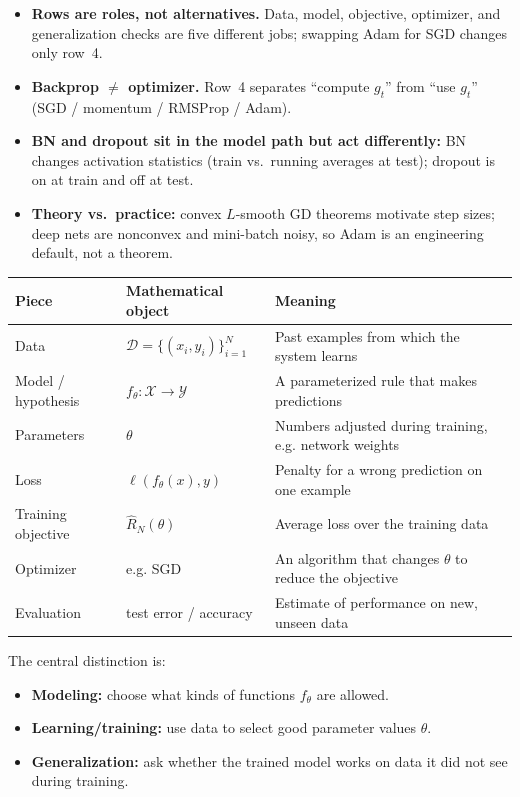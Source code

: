 \documentclass[11pt,a4paper]{article}
\theoremstyle{definition}
\begin{document}
\begin{remark}
\begin{itemize}
  \item \textbf{Rows are roles, not alternatives.} Data, model, objective, optimizer, and generalization checks are five different jobs; swapping Adam for SGD changes only row~4.
  \item \textbf{Backprop $\neq$ optimizer.} Row~4 separates ``compute $g_t$'' from ``use $g_t$'' (SGD / momentum / RMSProp / Adam).
  \item \textbf{BN and dropout sit in the model path but act differently:} BN changes activation statistics (train vs.\ running averages at test); dropout is on at train and off at test.
  \item \textbf{Theory vs.\ practice:} convex $L$-smooth GD theorems motivate step sizes; deep nets are nonconvex and mini-batch noisy, so Adam is an engineering default, not a theorem.
\end{itemize}
\end{remark}

\begin{center}
\begin{tabular}{|l|l|l|}
  \hline
  \textbf{Piece} & \textbf{Mathematical object} & \textbf{Meaning} \\ \hline
  Data & $\mathcal{D} = \{(x_i, y_i)\}_{i=1}^N$ & Past examples from which the system learns \\ \hline
  Model / hypothesis & $f_\theta : \mathcal{X} \to \mathcal{Y}$ & A parameterized rule that makes predictions \\ \hline
  Parameters & $\theta$ & Numbers adjusted during training, e.g. network weights \\ \hline
  Loss & $\ell(f_\theta(x), y)$ & Penalty for a wrong prediction on one example \\ \hline
  Training objective & $\widehat{R}_N(\theta)$ & Average loss over the training data \\ \hline
  Optimizer & e.g. SGD & An algorithm that changes $\theta$ to reduce the objective \\ \hline
  Evaluation & test error / accuracy & Estimate of performance on new, unseen data \\ \hline
  \end{tabular}
  \end{center}

  The central distinction is:
  
  \begin{itemize}
      \item \textbf{Modeling:} choose what kinds of functions $f_\theta$ are allowed.
      \item \textbf{Learning/training:} use data to select good parameter values $\theta$.
      \item \textbf{Generalization:} ask whether the trained model works on data it did not see during training.
  \end{itemize}
  
\end{document}
